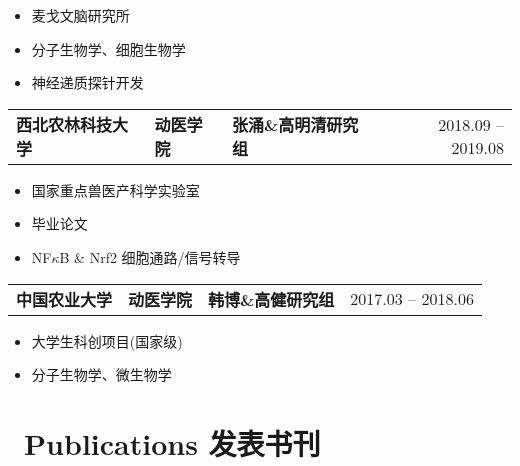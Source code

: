 \documentclass{resume}
\begin{document}
			\begin{itemize}
					\item 麦戈文脑研究所
					\item 分子生物学、细胞生物学
					\item 神经递质探针开发
			\end{itemize}

	\begin{tabularx}{\textwidth}{@{}X X X r@{}}
			\textbf{西北农林科技大学} & \textbf{动医学院} & \textbf{张涌\&高明清研究组} & 2018.09 -- 2019.08 \\
	\end{tabularx}

			\begin{itemize}
					\item 国家重点兽医产科学实验室
					\item 毕业论文
					\item NF$\kappa$B \& Nrf2 细胞通路/信号转导
			\end{itemize}

	\begin{tabularx}{\textwidth}{@{}X X X r@{}}
			\textbf{中国农业大学} & \textbf{动医学院} & \textbf{韩博\&高健研究组} & 2017.03 -- 2018.06 \\
	\end{tabularx}

			\begin{itemize}
					\item 大学生科创项目(国家级)
					\item 分子生物学、微生物学
			\end{itemize}

		
	\section{\faGraduationCap\ Publications 发表书刊}
\end{document}

